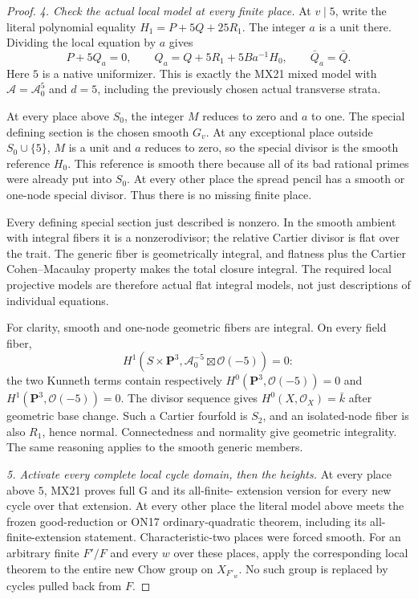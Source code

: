 \begin{proof}
\emph{4. Check the actual local model at every finite place.}
At $v\mid5$, write the literal polynomial equality
$H_1=P+5Q+25R_1$.  The integer $a$ is a unit there.  Dividing the
local equation by $a$ gives
\[
 P+5Q_a=0,\qquad
 Q_a=Q+5R_1+5B a^{-1}H_0,
                       \qquad\bar Q_a=\bar Q.
 \tag{MG21.9}\label{r21mg:localmixed}
\]
Here $5$ is a native uniformizer.  This is exactly the MX21
mixed model with $\mathcal A=\mathcal A_0^5$ and $d=5$,
including the previously chosen actual transverse strata.

At every place above $S_0$, the integer $M$ reduces to zero and
$a$ to one.  The special defining section is the chosen smooth
$G_v$.  At any exceptional place outside $S_0\cup\{5\}$, $M$
is a unit and $a$ reduces to zero, so the special divisor is the
smooth reference $H_0$.  This reference is smooth there because
all of its bad rational primes were already put into $S_0$.
At every other place the spread pencil has a smooth or one-node
special divisor.  Thus there is no missing finite place.

Every defining special section just described is nonzero.  In the
smooth ambient with integral fibers it is a nonzerodivisor; the
relative Cartier divisor is flat over the trait.  The generic
fiber is geometrically integral, and flatness plus the Cartier
Cohen--Macaulay property makes the total closure integral.  The
required local projective models are therefore actual flat
integral models, not just descriptions of individual equations.

For clarity, smooth and one-node geometric fibers are integral.
On every field fiber,
\[
 H^1(S\times\mathbf P^3,
                \mathcal A_0^{-5}\boxtimes\mathcal O(-5))=0:
 \tag{MG21.10}\label{r21mg:connected}
\]
the two Kunneth terms contain respectively
$H^0(\mathbf P^3,\mathcal O(-5))=0$ and
$H^1(\mathbf P^3,\mathcal O(-5))=0$.
The divisor sequence gives $H^0(X,\mathcal O_X)=\bar k$ after
geometric base change.  Such a Cartier fourfold is $S_2$, and
an isolated-node fiber is also $R_1$, hence normal.  Connectedness
and normality give geometric integrality.  The same reasoning
applies to the smooth generic members.

\emph{5. Activate every complete local cycle domain, then the heights.}
At every place above $5$, MX21 proves full G and its all-finite-
extension version for every new cycle over that extension.
At every other place the literal model above meets the frozen
good-reduction or ON17 ordinary-quadratic theorem, including its
all-finite-extension statement.  Characteristic-two places were
forced smooth.  For an arbitrary finite $F'/F$ and every $w$ over
these places, apply the corresponding local theorem to the entire
new Chow group on $X_{F'_w}$.  No such group is replaced by cycles
pulled back from $F$.


\end{proof}
